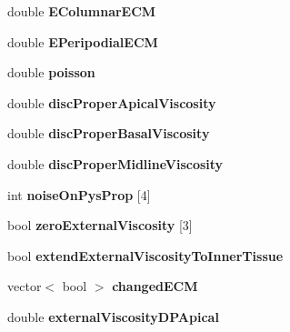 \begin{DoxyCompactItemize}
\item 
\hypertarget{classSimulation_a82219fd675e3f94e3de603f01af32dd9}{}double {\bfseries E\+Columnar\+E\+C\+M}\label{classSimulation_a82219fd675e3f94e3de603f01af32dd9}

\item 
\hypertarget{classSimulation_a66bc1ebb86876dd826aee17cd78764f2}{}double {\bfseries E\+Peripodial\+E\+C\+M}\label{classSimulation_a66bc1ebb86876dd826aee17cd78764f2}

\item 
\hypertarget{classSimulation_a49bdb9254f7b7f5a6e33352c43881422}{}double {\bfseries poisson}\label{classSimulation_a49bdb9254f7b7f5a6e33352c43881422}

\item 
\hypertarget{classSimulation_a6db999f14bd36d808d133eb9ae702f9a}{}double {\bfseries disc\+Proper\+Apical\+Viscosity}\label{classSimulation_a6db999f14bd36d808d133eb9ae702f9a}

\item 
\hypertarget{classSimulation_a3332b7870109dcfcf57bdd36566844e9}{}double {\bfseries disc\+Proper\+Basal\+Viscosity}\label{classSimulation_a3332b7870109dcfcf57bdd36566844e9}

\item 
\hypertarget{classSimulation_a5940ac39f46fd4f07d6cde8bb403fb80}{}double {\bfseries disc\+Proper\+Midline\+Viscosity}\label{classSimulation_a5940ac39f46fd4f07d6cde8bb403fb80}

\item 
\hypertarget{classSimulation_a5e1b2288bbab80084380420e00a1f371}{}int {\bfseries noise\+On\+Pys\+Prop} \mbox{[}4\mbox{]}\label{classSimulation_a5e1b2288bbab80084380420e00a1f371}

\item 
\hypertarget{classSimulation_a865d265405d3d496d3755735ff72484b}{}bool {\bfseries zero\+External\+Viscosity} \mbox{[}3\mbox{]}\label{classSimulation_a865d265405d3d496d3755735ff72484b}

\item 
\hypertarget{classSimulation_a850dff7ea7bb0fe75dd0e2cac62d9eba}{}bool {\bfseries extend\+External\+Viscosity\+To\+Inner\+Tissue}\label{classSimulation_a850dff7ea7bb0fe75dd0e2cac62d9eba}

\item 
\hypertarget{classSimulation_af695399c32c24e472d0bd2b88aad297a}{}vector$<$ bool $>$ {\bfseries changed\+E\+C\+M}\label{classSimulation_af695399c32c24e472d0bd2b88aad297a}

\item 
\hypertarget{classSimulation_ae0960e3fb2edb70918f75e27826d3bad}{}double {\bfseries external\+Viscosity\+D\+P\+Apical}\label{classSimulation_ae0960e3fb2edb70918f75e27826d3bad}


\end{DoxyCompactItemize}
